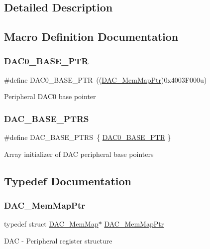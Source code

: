 \subsection{Detailed Description}


\subsection{Macro Definition Documentation}
\mbox{\label{group___d_a_c___peripheral_gabe3b30df06ec04e5c899efd6e49f1800}} 
\subsubsection{\texorpdfstring{D\+A\+C0\+\_\+\+B\+A\+S\+E\+\_\+\+P\+TR}{DAC0\_BASE\_PTR}}
{\footnotesize\ttfamily \#define D\+A\+C0\+\_\+\+B\+A\+S\+E\+\_\+\+P\+TR~((\hyperlink{group___d_a_c___peripheral_gaf4fffbe25ce148c577ec740897223a7f}{D\+A\+C\+\_\+\+Mem\+Map\+Ptr})0x4003\+F000u)}

Peripheral D\+A\+C0 base pointer \mbox{\label{group___d_a_c___peripheral_gab47690040e4d63adc4f324358c27157a}} 
\subsubsection{\texorpdfstring{D\+A\+C\+\_\+\+B\+A\+S\+E\+\_\+\+P\+T\+RS}{DAC\_BASE\_PTRS}}
{\footnotesize\ttfamily \#define D\+A\+C\+\_\+\+B\+A\+S\+E\+\_\+\+P\+T\+RS~\{ \hyperlink{group___d_a_c___peripheral_gabe3b30df06ec04e5c899efd6e49f1800}{D\+A\+C0\+\_\+\+B\+A\+S\+E\+\_\+\+P\+TR} \}}

Array initializer of D\+AC peripheral base pointers 

\subsection{Typedef Documentation}
\mbox{\label{group___d_a_c___peripheral_gaf4fffbe25ce148c577ec740897223a7f}} 
\subsubsection{\texorpdfstring{D\+A\+C\+\_\+\+Mem\+Map\+Ptr}{DAC\_MemMapPtr}}
{\footnotesize\ttfamily typedef struct \hyperlink{struct_d_a_c___mem_map}{D\+A\+C\+\_\+\+Mem\+Map}$\ast$ \hyperlink{group___d_a_c___peripheral_gaf4fffbe25ce148c577ec740897223a7f}{D\+A\+C\+\_\+\+Mem\+Map\+Ptr}}

D\+AC -\/ Peripheral register structure 